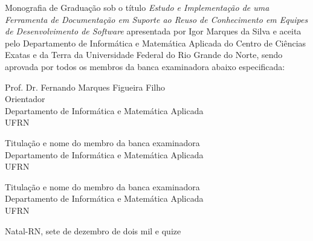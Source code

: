 \begin{folhadeaprovacao}
	\setlength{\ABNTsignthickness}{0.4pt}
	\setlength{\ABNTsignwidth}{10cm}

	\noindent
	Monografia de Graduação sob o título \textit{Estudo e Implementação de uma Ferramenta de Documentação em Suporte ao Reuso de Conhecimento em Equipes de Desenvolvimento de Software} apresentada por
	Igor Marques da Silva e aceita pelo Departamento de Informática e Matemática Aplicada do
	Centro de Ciências Exatas e da Terra da Universidade Federal do Rio Grande do Norte,
	sendo aprovada por todos os membros da banca examinadora abaixo especificada:

	\assinatura
	{
		Prof. Dr. Fernando Marques Figueira Filho\\
		{\small Orientador} 															\\
		{\footnotesize
			Departamento de Informática e Matemática Aplicada 																	\\
		  	UFRN
		}
	}

	\assinatura
	{
		Titulação e nome do membro da banca examinadora 						 \\
		{\footnotesize
			Departamento de Informática e Matemática Aplicada 																	\\
		  	UFRN
		}
	}

	\assinatura
	{
		Titulação e nome do membro da banca examinadora 						 \\
		{\footnotesize
			Departamento de Informática e Matemática Aplicada 																	\\
		  	UFRN
		}
	}

	\vfill

	\begin{center}
		Natal-RN, sete de dezembro de dois mil e quize
	\end{center}
\end{folhadeaprovacao}
